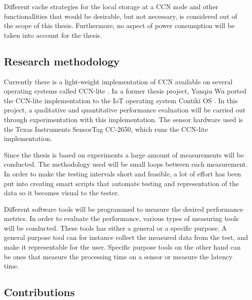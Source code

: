 Different cache strategies for the local storage at a CCN node and other functionallities that would be desirable, but not necessary, is considered out of the scope of this thesis. Furthermore, no aspect of power consumption will be taken into account for the thesis.

\subsection{Research methodology}
Currently there is a light-weight implementation of CCN available on several operating systems called CCN-lite \cite{CCN-LITE}. In a former thesis project, Yanqiu Wu ported the CCN-lite implementation to the IoT operating system Contiki OS \cite{yanqui}. In this project, a qualitative and quantitative performance evaluation will be carried out through experimentation with this implementation. The sensor hardware used is the Texas Instruments SensorTag CC-2650, which runs the CCN-lite implementation. 

Since the thesis is based on experiments a large amount of measurements will be conducted. The methodology used will be  small loops between each measurement. %
In order to make the testing intervals short and feasible, a lot of effort has been put into creating smart scripts that automate testing and representation of the data so it becomes visual to the tester. 

Different software tools will be programmed to measure the desired performance metrics. 
In order to evaluate the performance, various types of measuring tools will be conducted. These tools has either a general or a specific purpose. A general purpose tool can for instance collect the measured data from the test, and make it representable for the user. Specific purpose tools on the other hand can be ones that measure the processing time on a sensor or measure the latency time. 

\subsection{Contributions}

